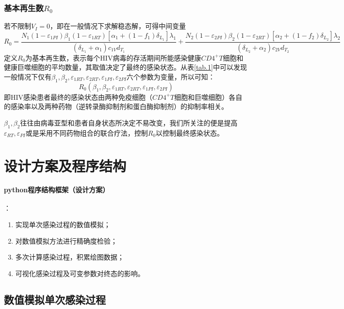 \documentclass{ctexart}
\begin{document}
\subsubsection{基本再生数$R_{0}$}
若不限制$V_{I}=0$，即在一般情况下求解稳态解，可得中间变量$$R_{0}=\frac{N_{1}(1-\varepsilon _{1PI})\beta_{1}(1-\varepsilon _{1RT})[\alpha_{1}+(1-f_{1})\delta_{L_{1}}]\lambda _{1}}{(\delta _{L_{1}}+\alpha_{1})c_{1V}d_{T_{1}}}+\frac{N_{2}(1-\varepsilon _{2PI})\beta_{2}(1-\varepsilon _{2RT})[\alpha_{2}+(1-f_{2})\delta_{L_{2}}]\lambda _{2}}{(\delta _{L_{2}}+\alpha_{2})c_{2V}d_{T_{2}}}$$定义$R_{0}$为基本再生数，表示每个HIV病毒的存活期间所能感染健康$CD4^{+}T$细胞和健康巨噬细胞的平均数量，其取值决定了最终的感染状态\cite{1}。从表\ref{tab.1}中可以发现一般情况下仅有$\beta_{1},\beta_{2},\varepsilon _{1RT},\varepsilon _{2RT},\varepsilon _{1PI},\varepsilon _{2PI}$六个参数为变量，所以可知：$$R_{0}(\beta_{1},\beta_{2},\varepsilon _{1RT},\varepsilon _{2RT},\varepsilon _{1PI},\varepsilon _{2PI})$$即HIV感染患者最终的感染状态由两种免疫细胞（$CD4^{+}T$细胞和巨噬细胞）各自的感染率以及两种药物（逆转录酶抑制剂和蛋白酶抑制剂）的抑制率相关。

$\beta_{1},\beta_{2}$往往由病毒亚型和患者自身状态所决定不易改变，我们所关注的便是提高$\varepsilon _{RT},\varepsilon _{PI}$或是采用不同药物组合的联合疗法，控制$R_{0}$以控制最终感染状态。

\section{设计方案及程序结构}
\paragraph{python程序结构框架（设计方案）}：
\begin{enumerate}
    \item 实现单次感染过程的数值模拟；
    \item 对数值模拟方法进行精确度检验；
    \item 多次计算感染过程，积累绘图数据；
    \item 可视化感染过程及可变参数对终态的影响。
\end{enumerate}
\subsection{数值模拟单次感染过程}
\end{document}

